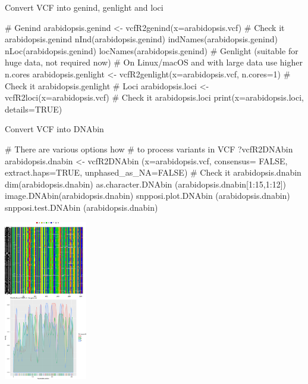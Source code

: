 \documentclass[compress, ucs, xelatex, 11pt, xcolor=svgnames,
	hyperref={
		bookmarks=true,
		unicode=true,
		colorlinks=true,
		pdftitle={Molecular data in R},
		plainpages=false,
		pdfauthor={Vojtech Zeisek},
		pdfsubject={Course about phylogeny and evolution in R},
		pdfcreator={XeLaTeX},
		pdfkeywords={R, evolution, phylogeny, molecular data},
		linkcolor=Tomato,
		anchorcolor=SaddleBrown,
		citecolor=Goldenrod,
		filecolor=DarkMagenta,
		menucolor=Sienna,
		urlcolor=DarkTurquoise,
		pdftex},
	url={hyphens, lowtilde} %
	]{beamer}
\begin{document}
\begin{frame}[fragile]{Convert VCF into genind, genlight and loci}
	\begin{spluscode}
    # Genind
    arabidopsis.genind <- vcfR2genind(x=arabidopsis.vcf)
    # Check it
    arabidopsis.genind
    nInd(arabidopsis.genind)
    indNames(arabidopsis.genind)
    nLoc(arabidopsis.genind)
    locNames(arabidopsis.genind)
    # Genlight (suitable for huge data, not required now)
    # On Linux/macOS and with large data use higher n.cores
    arabidopsis.genlight <- vcfR2genlight(x=arabidopsis.vcf, n.cores=1)
    # Check it
    arabidopsis.genlight
    # Loci
    arabidopsis.loci <- vcfR2loci(x=arabidopsis.vcf)
    # Check it
    arabidopsis.loci
    print(x=arabidopsis.loci, details=TRUE)
	\end{spluscode}
\end{frame}

\begin{frame}[fragile]{Convert VCF into DNAbin}
	\begin{multicols}{2}
	\begin{spluscode}
    # There are various options how
    # to process variants in VCF
    ?vcfR2DNAbin
    arabidopsis.dnabin <- vcfR2DNAbin
      (x=arabidopsis.vcf, consensus=
      FALSE, extract.haps=TRUE,
      unphased_as_NA=FALSE)
    # Check it
    arabidopsis.dnabin
    dim(arabidopsis.dnabin)
    as.character.DNAbin
      (arabidopsis.dnabin[1:15,1:12])
    image.DNAbin(arabidopsis.dnabin)
    snpposi.plot.DNAbin
      (arabidopsis.dnabin)
    snpposi.test.DNAbin
      (arabidopsis.dnabin)
	\end{spluscode}
	\begin{center}
		\includegraphics[height=7cm]{vcf_dna.png}
	\end{center}
	\end{multicols}
\end{frame}
\end{document}
